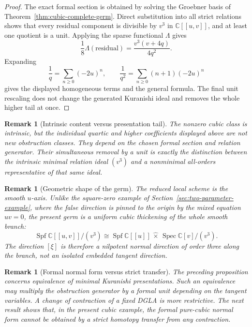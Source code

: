 \documentclass[11pt]{amsart}
\newtheorem{remark}[theorem]{Remark}
\newcommand{\Spec}{\operatorname{Spec}}
\newcommand{\C}{\mathbb C}
\newcommand{\Spf}{\operatorname{Spf}}
\begin{document}
\begin{proof}
The exact formal section is obtained by solving the Groebner basis of Theorem~\ref{thm:cubic-complete-germ}.  Direct substitution into all strict relations shows that every residual component is divisible by $v^3$ in $\C[[u,v]]$, and at least one quotient is a unit.  Applying the sparse functional $\Lambda$ gives
\[
\frac18\Lambda(\text{residual})
=
\frac{v^3(v+4q)}{4q^2}.
\]
Expanding
\[
\frac1q=\sum_{n\ge0}(-2u)^n,
\qquad
\frac1{q^2}=\sum_{n\ge0}(n+1)(-2u)^n
\]
gives the displayed homogeneous terms and the general formula.  The final unit rescaling does not change the generated Kuranishi ideal and removes the whole higher tail at once.
\end{proof}

\begin{remark}[Intrinsic content versus presentation tail]
The nonzero cubic class is intrinsic, but the individual quartic and higher coefficients displayed above are not new obstruction classes.  They depend on the chosen formal section and relation generator.  Their simultaneous removal by a unit is exactly the distinction between the intrinsic minimal relation ideal $(v^3)$ and a nonminimal all-orders representative of that same ideal.
\end{remark}

\begin{remark}[Geometric shape of the germ]
The reduced local scheme is the smooth $u$-axis.  Unlike the square-zero example of Section~\ref{sec:two-parameter-example}, where the false direction is pinned to the origin by the mixed equation $uv=0$, the present germ is a uniform cubic thickening of the whole smooth branch:
\[
\Spf\C[[u,v]]/(v^3)
\cong
\Spf\C[[u]]\,\widehat\times\,\Spec\C[v]/(v^3).
\]
The direction $[\xi]$ is therefore a nilpotent normal direction of order three along the branch, not an isolated embedded tangent direction.
\end{remark}

\begin{remark}[Formal normal form versus strict transfer]
The preceding proposition concerns equivalence of minimal Kuranishi presentations.  Such an equivalence may multiply the obstruction generator by a formal unit depending on the tangent variables.  A change of contraction of a fixed DGLA is more restrictive.  The next result shows that, in the present cubic example, the formal pure-cubic normal form cannot be obtained by a strict homotopy transfer from any contraction.
\end{remark}
\end{document}
